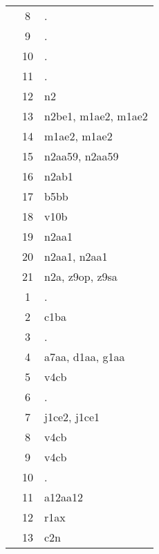 \begin{table}[htbp]
\begin{tabular}{c c l}
	 & 8 & . \\
	 & 9 & . \\
	 & 10 & . \\
	 & 11 & . \\
	 & 12 & n2 \\
	 & 13 & n2be1, m1ae2, m1ae2 \\
	 & 14 & m1ae2, m1ae2 \\
	 & 15 & n2aa59, n2aa59 \\
	 & 16 & n2ab1 \\
	 & 17 & b5bb \\
	 & 18 & v10b \\
	 & 19 & n2aa1 \\
	 & 20 & n2aa1, n2aa1 \\
	 & 21 & n2a, z9op, z9sa \\
	\addlinespace
	8 & 1 & . \\
	 & 2 & c1ba \\
	 & 3 & . \\
	 & 4 & a7aa, d1aa, g1aa \\
	 & 5 & v4cb \\
	 & 6 & . \\
	 & 7 & j1ce2, j1ce1 \\
	 & 8 & v4cb \\
	 & 9 & v4cb \\
	 & 10 & . \\
	 & 11 & a12aa12 \\
	 & 12 & r1ax \\
	 & 13 & c2n \\
	\bottomrule
\end{tabular}
\end{table}


